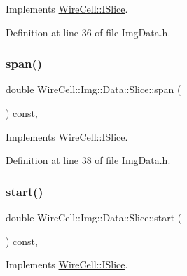 Implements \hyperlink{class_wire_cell_1_1_i_slice_ab5c8c4d99b373a92cdd54ef5dafde4ec}{Wire\+Cell\+::\+I\+Slice}.



Definition at line 36 of file Img\+Data.\+h.

\mbox{\label{class_wire_cell_1_1_img_1_1_data_1_1_slice_a35e3999928c41c60b3f0e3eb738c29ca}} 
\subsubsection{\texorpdfstring{span()}{span()}}
{\footnotesize\ttfamily double Wire\+Cell\+::\+Img\+::\+Data\+::\+Slice\+::span (\begin{DoxyParamCaption}{ }\end{DoxyParamCaption}) const\hspace{0.3cm}{\ttfamily [inline]}, {\ttfamily [virtual]}}



Implements \hyperlink{class_wire_cell_1_1_i_slice_a9c461c84b7b71199ea521bd274df42c6}{Wire\+Cell\+::\+I\+Slice}.



Definition at line 38 of file Img\+Data.\+h.

\mbox{\label{class_wire_cell_1_1_img_1_1_data_1_1_slice_acf8f4a84cbee31e3940c387708348f88}} 
\subsubsection{\texorpdfstring{start()}{start()}}
{\footnotesize\ttfamily double Wire\+Cell\+::\+Img\+::\+Data\+::\+Slice\+::start (\begin{DoxyParamCaption}{ }\end{DoxyParamCaption}) const\hspace{0.3cm}{\ttfamily [inline]}, {\ttfamily [virtual]}}



Implements \hyperlink{class_wire_cell_1_1_i_slice_a46a59a60460e2915f80b9647b3b3a82d}{Wire\+Cell\+::\+I\+Slice}.



